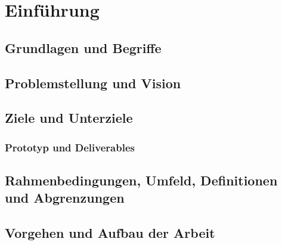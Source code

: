 
\section{Einführung}
\label{Einführung}


\subsection{Grundlagen und Begriffe}
\label{Einführung:Grundlagen und Begriffe}


\subsection{Problemstellung und Vision}
\label{Einführung:Problemstellung und Vision}


\subsection{Ziele und Unterziele}
\label{Einführung:Ziele und Unterziele}


\subsubsection{Prototyp und Deliverables}
\label{Ziele und Unterziele:Prototyp und Deliverables}


\subsection{Rahmenbedingungen, Umfeld, Definitionen und Abgrenzungen}
\label{Einführung:Rahmenbedingungen, Umfeld, Definitionen, Abgrenzungen}


\subsection{Vorgehen und Aufbau der Arbeit}
\label{Einführung:Vorgehen und Aufbau der Arbeit}

